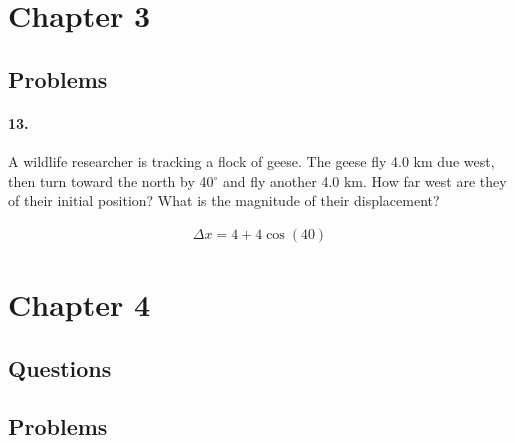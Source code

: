     \begin{multicols*}{2}
        \section*{Chapter 3}
        \subsection*{Problems}

        \paragraph*{13.}
        A wildlife researcher is tracking a flock of geese. The geese fly 4.0 km due west, then turn toward the north by 40$^{\circ}$ and fly another 4.0 km. How far west are they of their initial position? What is the magnitude of their displacement?

        \begin{mdframed}
            \begin{center}
            \end{center}
            
            \begin{equation*}
                \begin{gathered}
                    \Delta x = 4 + 4 \cos(40)
                \end{gathered}
            \end{equation*}
        \end{mdframed}

        \section*{Chapter 4}
        \subsection*{Questions}

        \subsection*{Problems}

    \end{multicols*}
